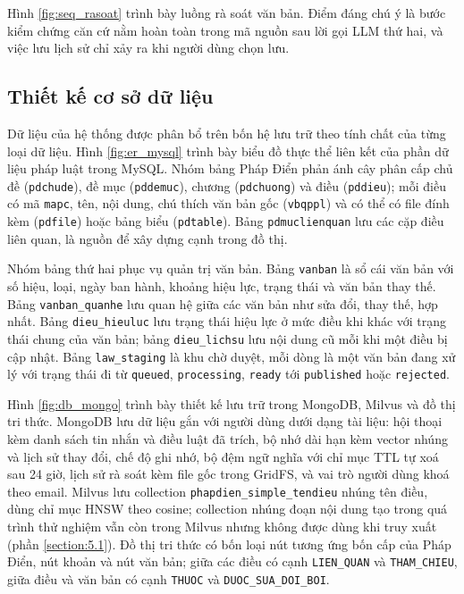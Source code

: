 \documentclass[../DoAn.tex]{subfiles}
\begin{document}

Hình \ref{fig:seq_rasoat} trình bày luồng rà soát văn bản. Điểm đáng chú ý là bước kiểm chứng căn cứ nằm hoàn toàn trong mã nguồn sau lời gọi LLM thứ hai, và việc lưu lịch sử chỉ xảy ra khi người dùng chọn lưu.


\subsection{Thiết kế cơ sở dữ liệu}
Dữ liệu của hệ thống được phân bổ trên bốn hệ lưu trữ theo tính chất của từng loại dữ liệu. Hình \ref{fig:er_mysql} trình bày biểu đồ thực thể liên kết của phần dữ liệu pháp luật trong MySQL. Nhóm bảng Pháp Điển phản ánh cây phân cấp chủ đề (\texttt{pdchude}), đề mục (\texttt{pddemuc}), chương (\texttt{pdchuong}) và điều (\texttt{pddieu}); mỗi điều có mã \texttt{mapc}, tên, nội dung, chú thích văn bản gốc (\texttt{vbqppl}) và có thể có file đính kèm (\texttt{pdfile}) hoặc bảng biểu (\texttt{pdtable}). Bảng \texttt{pdmuclienquan} lưu các cặp điều liên quan, là nguồn để xây dựng cạnh trong đồ thị.


Nhóm bảng thứ hai phục vụ quản trị văn bản. Bảng \texttt{vanban} là sổ cái văn bản với số hiệu, loại, ngày ban hành, khoảng hiệu lực, trạng thái và văn bản thay thế. Bảng \texttt{vanban\_quanhe} lưu quan hệ giữa các văn bản như sửa đổi, thay thế, hợp nhất. Bảng \texttt{dieu\_hieuluc} lưu trạng thái hiệu lực ở mức điều khi khác với trạng thái chung của văn bản; bảng \texttt{dieu\_lichsu} lưu nội dung cũ mỗi khi một điều bị cập nhật. Bảng \texttt{law\_staging} là khu chờ duyệt, mỗi dòng là một văn bản đang xử lý với trạng thái đi từ \texttt{queued}, \texttt{processing}, \texttt{ready} tới \texttt{published} hoặc \texttt{rejected}.

Hình \ref{fig:db_mongo} trình bày thiết kế lưu trữ trong MongoDB, Milvus và đồ thị tri thức. MongoDB lưu dữ liệu gắn với người dùng dưới dạng tài liệu: hội thoại kèm danh sách tin nhắn và điều luật đã trích, bộ nhớ dài hạn kèm vector nhúng và lịch sử thay đổi, chế độ ghi nhớ, bộ đệm ngữ nghĩa với chỉ mục TTL tự xoá sau 24 giờ, lịch sử rà soát kèm file gốc trong GridFS, và vai trò người dùng khoá theo email. Milvus lưu collection \texttt{phapdien\_simple\_tendieu} nhúng tên điều, dùng chỉ mục HNSW theo cosine; collection nhúng đoạn nội dung tạo trong quá trình thử nghiệm vẫn còn trong Milvus nhưng không được dùng khi truy xuất (phần \ref{section:5.1}). Đồ thị tri thức có bốn loại nút tương ứng bốn cấp của Pháp Điển, nút khoản và nút văn bản; giữa các điều có cạnh \texttt{LIEN\_QUAN} và \texttt{THAM\_CHIEU}, giữa điều và văn bản có cạnh \texttt{THUOC} và \texttt{DUOC\_SUA\_DOI\_BOI}.
\end{document}
